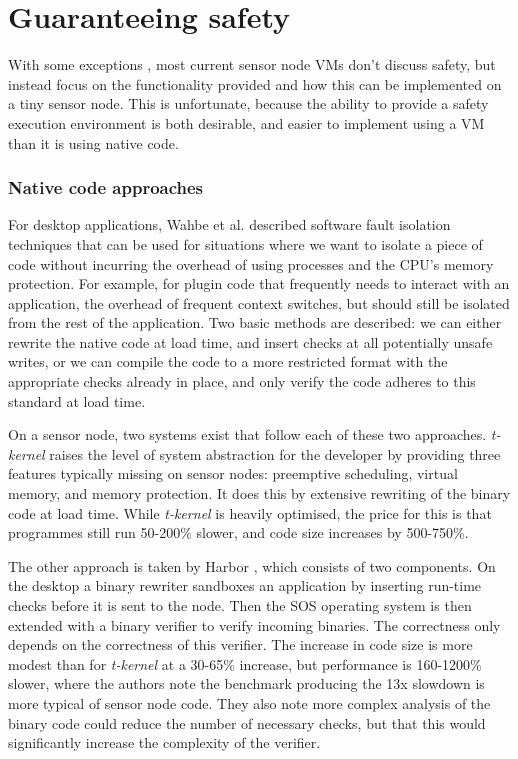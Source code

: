 \chapter{Guaranteeing safety}

With some exceptions \cite{Evers:2010ur}, most current sensor node VMs don't discuss safety, but instead focus on the functionality provided and how this can be implemented on a tiny sensor node. This is unfortunate, because the ability to provide a safety execution environment is both desirable, and easier to implement using a VM than it is using native code.

\subsection{Native code approaches}
For desktop applications, Wahbe et al. described software fault isolation \cite{Wahbe:1994cj} techniques that can be used for situations where we want to isolate a piece of code without incurring the overhead of using processes and the CPU's memory protection. For example, for plugin code that frequently needs to interact with an application, the overhead of frequent context switches, but should still be isolated from the rest of the application. Two basic methods are described: we can either rewrite the native code at load time, and insert checks at all potentially unsafe writes, or we can compile the code to a more restricted format with the appropriate checks already in place, and only verify the code adheres to this standard at load time.

On a sensor node, two systems exist that follow each of these two approaches. \emph{t-kernel} raises the level of system abstraction for the developer by providing three features typically missing on sensor nodes: preemptive scheduling, virtual memory, and memory protection. It does this by extensive rewriting of the binary code at load time. While \emph{t-kernel} is heavily optimised, the price for this is that programmes still run 50-200\% slower, and code size increases by 500-750\%.

The other approach is taken by Harbor \cite{Kumar:2007ge}, which consists of two components. On the desktop a binary rewriter sandboxes an application by inserting run-time checks before it is sent to the node. Then the SOS operating system is then extended with a binary verifier to verify incoming binaries. The correctness only depends on the correctness of this verifier. The increase in code size is more modest than for \emph{t-kernel} at a 30-65\% increase, but performance is 160-1200\% slower, where the authors note the benchmark producing the 13x slowdown is more typical of sensor node code. They also note more complex analysis of the binary code could reduce the number of necessary checks, but that this would significantly increase the complexity of the verifier.


